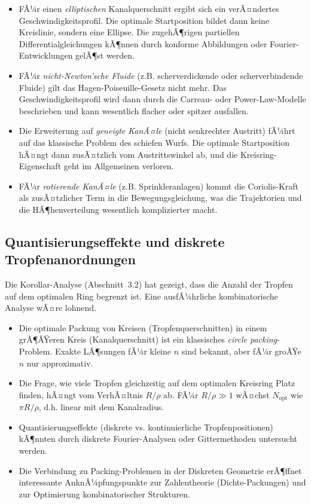 ﻿\documentclass[a4paper,12pt]{article}
\theoremstyle{definition}
\begin{document}
\begin{itemize}
    \item FÃ¼r einen \emph{elliptischen} Kanalquerschnitt ergibt sich ein verÃ¤ndertes
          Geschwindigkeitsprofil. Die optimale Startposition bildet dann keine Kreislinie,
          sondern eine Ellipse. Die zugehÃ¶rigen partiellen Differentialgleichungen kÃ¶nnen
          durch konforme Abbildungen oder Fourier-Entwicklungen gelÃ¶st werden.
    \item FÃ¼r \emph{nicht-Newton'sche Fluide} (z.B. scherverdickende oder scherverbindende
          Fluide) gilt das Hagen-Poiseuille-Gesetz nicht mehr. Das Geschwindigkeitsprofil
          wird dann durch die Carreau- oder Power-Law-Modelle beschrieben und kann
          wesentlich flacher oder spitzer ausfallen.
    \item Die Erweiterung auf \emph{geneigte KanÃ¤le} (nicht senkrechter Austritt) fÃ¼hrt
          auf das klassische Problem des schiefen Wurfs. Die optimale Startposition hÃ¤ngt
          dann zusÃ¤tzlich vom Austrittswinkel ab, und die Kreisring-Eigenschaft geht
          im Allgemeinen verloren.
    \item FÃ¼r \emph{rotierende KanÃ¤le} (z.B. Sprinkleranlagen) kommt die Coriolis-Kraft
          als zusÃ¤tzlicher Term in die Bewegungsgleichung, was die Trajektorien und die
          HÃ¶henverteilung wesentlich komplizierter macht.
\end{itemize}

\subsection{Quantisierungseffekte und diskrete Tropfenanordnungen}

Die Korollar-Analyse (Abschnitt~3.2) hat gezeigt, dass die Anzahl der Tropfen auf dem
optimalen Ring begrenzt ist. Eine ausfÃ¼hrliche kombinatorische Analyse wÃ¤re lohnend.

\begin{itemize}
    \item Die optimale Packung von Kreisen (Tropfenquerschnitten) in einem grÃ¶ÃŸeren Kreis
          (Kanalquerschnitt) ist ein klassisches \emph{circle packing}-Problem.
          Exakte LÃ¶sungen fÃ¼r kleine $n$ sind bekannt, aber fÃ¼r groÃŸe $n$ nur approximativ.
    \item Die Frage, wie viele Tropfen gleichzeitig auf dem optimalen Kreisring Platz finden,
          hÃ¤ngt vom VerhÃ¤ltnis $R/\rho$ ab. FÃ¼r $R/\rho \gg 1$ wÃ¤chst $N_{\text{opt}}$
          wie $\pi R / \rho$, d.h. linear mit dem Kanalradius.
    \item Quantisierungseffekte (diskrete vs. kontinuierliche Tropfenpositionen) kÃ¶nnten
          durch diskrete Fourier-Analysen oder Gittermethoden untersucht werden.
    \item Die Verbindung zu Packing-Problemen in der Diskreten Geometrie erÃ¶ffnet
          interessante AnknÃ¼pfungspunkte zur Zahlentheorie (Dichte-Packungen) und zur
          Optimierung kombinatorischer Strukturen.
\end{itemize}
\end{document}
